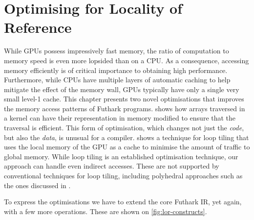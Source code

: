 \chapter{Optimising for Locality of Reference}
\label{chap:tiling}

While GPUs possess impressively fast memory, the ratio of computation
to memory speed is even more lopsided than on a CPU.  As a
consequence, accessing memory efficiently is of critical importance to
obtaining high performance.  Furthermore, while CPUs have multiple
layers of automatic caching to help mitigate the effect of the memory
wall, GPUs typically have only a single very small level-1 cache.
This chapter presents two novel optimisations that improves the memory
access patterns of Futhark programs.  
shows how arrays traversed in a kernel can have their representation
in memory modified to ensure that the traversal is efficient.  This
form of optimisation, which changes not just the \textit{code}, but
also the \textit{data}, is unusual for a compiler.
 shows a technique for loop tiling that
uses the local memory of the GPU as a cache to minimise the amount of
traffic to global memory.  While loop tiling is an established
optimisation technique, our approach can handle even indirect
accesses.  These are not supported by conventional techniques for loop
tiling, including polyhedral approaches such as the ones discussed in
\cite{chatarasi2015polyhedral}.

To express the optimisations we have to extend the core Futhark IR,
yet again, with a few more operations.  These are shown on
\cref{fig:lor-constructs}.

